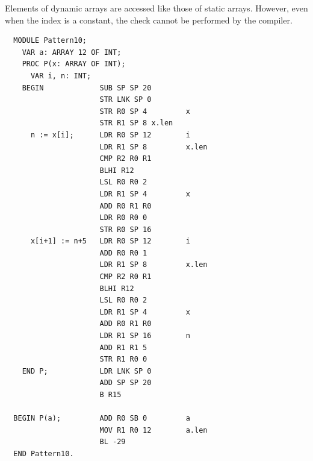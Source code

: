 Elements of dynamic arrays are accessed like those of static arrays. However, even when the index is a
constant, the check cannot be performed by the compiler.
\begin{verbatim}
  MODULE Pattern10;
    VAR a: ARRAY 12 OF INT;
    PROC P(x: ARRAY OF INT);
      VAR i, n: INT;
    BEGIN             SUB SP SP 20              
                      STR LNK SP 0
                      STR R0 SP 4         x
                      STR R1 SP 8 x.len
      n := x[i];      LDR R0 SP 12        i
                      LDR R1 SP 8         x.len
                      CMP R2 R0 R1
                      BLHI R12
                      LSL R0 R0 2
                      LDR R1 SP 4         x
                      ADD R0 R1 R0
                      LDR R0 R0 0
                      STR R0 SP 16
      x[i+1] := n+5   LDR R0 SP 12        i
                      ADD R0 R0 1
                      LDR R1 SP 8         x.len
                      CMP R2 R0 R1
                      BLHI R12
                      LSL R0 R0 2
                      LDR R1 SP 4         x
                      ADD R0 R1 R0
                      LDR R1 SP 16        n
                      ADD R1 R1 5
                      STR R1 R0 0
    END P;            LDR LNK SP 0
                      ADD SP SP 20
                      B R15
                      
  BEGIN P(a);         ADD R0 SB 0         a
                      MOV R1 R0 12        a.len
                      BL -29
  END Pattern10.
\end{verbatim}

